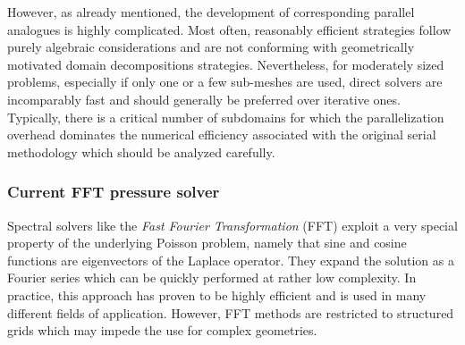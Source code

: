 However, as already mentioned, the development of corresponding parallel analogues is highly complicated.
Most often, reasonably efficient strategies follow purely algebraic considerations
and are not conforming with geometrically motivated domain decompositions strategies.
Nevertheless, for  moderately sized problems, especially if only one or a few sub-meshes are used, direct solvers are incomparably fast and should generally be preferred over iterative ones.
Typically, there is a critical number of subdomains for which the parallelization overhead dominates the numerical efficiency associated with the original serial methodology which should be analyzed carefully.
 
 

\subsubsection{Current FFT pressure solver}
\label{SEC_SCARC_fft_solver}

Spectral solvers like the {\it Fast Fourier Transformation} (FFT) exploit a very special property of the underlying Poisson problem, namely that sine and cosine functions are eigenvectors of the Laplace operator. They expand the solution as a Fourier series which can be quickly performed at rather low complexity. In practice, this approach has proven to be highly efficient and is used in many different fields of application. However, FFT methods are restricted to structured grids which may impede the use for complex geometries.

